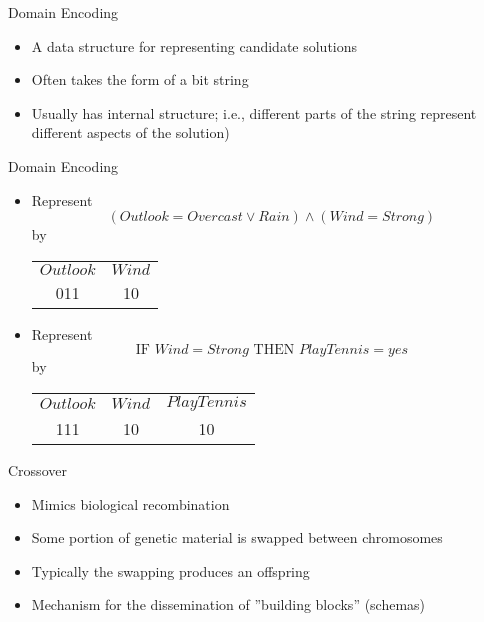 \documentclass[%
pdf,
colorBG,
slideColor,
tcrico,
]{prosper}
\begin{document}

\begin{slide}{ Domain Encoding }
\begin{itemize}
\item A data structure for representing candidate solutions
\item Often takes the form of a bit string 
\item Usually has internal structure; i.e., different parts of the string represent different aspects of the solution)
\end{itemize}
\end{slide}


\begin{slide}{ Domain Encoding }
\tiny 
\begin{itemize}
\item Represent \[ (Outlook = Overcast \vee Rain) \wedge (Wind = Strong) \] by
\begin{center}
\begin{tabular}{cc}
$Outlook$ & $Wind$ \\
011 & 10
\end{tabular}
\end{center}
\item Represent
\[\mbox{IF\ \ } Wind = Strong \mbox{\ \ \ THEN\ \ } PlayTennis=yes \]
by
\begin{center}
\begin{tabular}{ccc}
$Outlook$ & $Wind$ & $PlayTennis$ \\
111 & 10 & 10 \\
\end{tabular}
\end{center}
\end{itemize}
\end{slide}



\begin{slide}{ Crossover}
\begin{itemize}
\item Mimics biological recombination
\item Some portion of genetic material is swapped between chromosomes
\item Typically the swapping produces an offspring
\item Mechanism for the dissemination of ''building blocks'' (schemas)
\end{itemize}
\end{slide}
\end{document}
